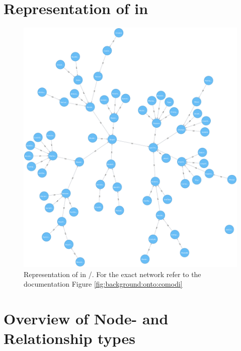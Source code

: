 \chapter{Representation of \comodi in \masymos}
\begin{figure}[h]
	\centering
	\includegraphics[width=\textwidth,height=0.5\textheight,keepaspectratio]{resources/neo4j-renders/comodi.pdf}
	\caption[Representation of \comodi in \masymos/\neoj]{Representation of \comodi in \masymos/\neoj. For the exact network refer to the documentation Figure \ref{fig:background:onto:comodi}}
	\label{fig:appendix:neo4j-comodi}
\end{figure}

\chapter{Overview of Node- and Relationship types}
\label{sec:appendix:meta-map}

